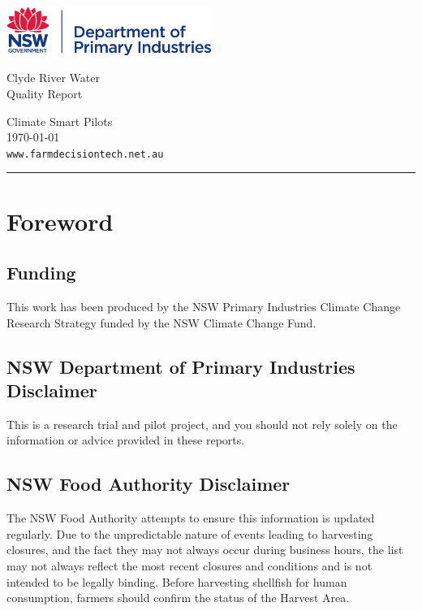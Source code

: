 \documentclass[10pt]{article}
\begin{document}
\begin{titlepage}
		\parbox[t]{0.93\textwidth}{
			\parbox[t]{0.91\textwidth}{
				\raggedright
				\fontsize{50pt}{80pt}\selectfont
				\vspace{0.7cm}
				\includegraphics[width=0.5\textwidth]{DPI_logo.png}
				
				Clyde River Water\\
				Quality Report\\
				\vspace{0.7cm}
			}
		}
	\vfill
	\parbox[t]{0.93\textwidth}{ 
		\raggedleft
		\large
		{\Large Climate Smart Pilots}\\[4pt] 
		\today \\
		\vspace{0.5cm}
		\texttt{www.farmdecisiontech.net.au}\\
		
		\hfill\rule{0.2\linewidth}{1pt}
	}
\end{titlepage}

\section*{Foreword}

\subsection*{Funding}
This work has been produced by the NSW Primary Industries Climate Change Research Strategy funded by the NSW Climate Change Fund.

\subsection*{NSW Department of Primary Industries Disclaimer}
This is a research trial and pilot project, and you should not rely solely on the information or advice provided in these reports.

\subsection*{NSW Food Authority Disclaimer}
The NSW Food Authority attempts to ensure this information is updated regularly. Due to the unpredictable nature of events leading to harvesting closures, and the fact they may not always occur during business hours, the list may not always reflect the most recent closures and conditions and is not intended to be legally binding. Before harvesting shellfish for human consumption, farmers should confirm the status of the Harvest Area.
\end{document}
